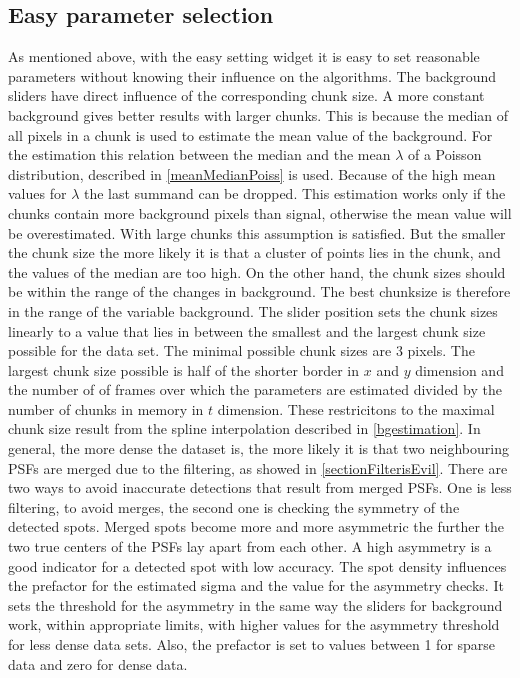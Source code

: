 \subsection{Easy parameter selection}\label{easyParam}
As mentioned above, with the easy setting widget it is easy to set reasonable parameters without knowing their influence on the algorithms.\newline
The background sliders have direct influence of the corresponding chunk size. A more constant background gives better results with larger chunks. This is because the median of all pixels in a chunk is used to estimate the mean value of the background. For the estimation this relation between the median and the mean $\lambda$ of a Poisson distribution, described in \ref{meanMedianPoiss} is used.
Because of the high mean values for $\lambda$ the last summand can be dropped.
This estimation works only if the chunks contain more background pixels than signal, otherwise the mean value will be overestimated. With large chunks this assumption is satisfied. But the smaller the chunk size the more likely it is that a cluster of points lies in the chunk, and the values of the median are too high. On the other hand, the chunk sizes should be within the range of the changes in background. The best chunksize is therefore in the range of the variable background. The slider position sets the chunk sizes linearly to a value that lies in between the smallest and the largest chunk size possible for the data set.\newline
The minimal possible chunk sizes are 3 pixels. The largest chunk size possible is half of the shorter border in $x$ and $y$ dimension and the number of of frames over which the parameters are estimated divided by the number of chunks in memory in $t$ dimension. These restricitons to the maximal chunk size result from the spline interpolation described in \ref{bgestimation}.\newline 
In general, the more dense the dataset is, the more likely it is that two neighbouring PSFs are merged due to the filtering, as showed in \ref{sectionFilterisEvil}. There are two ways to avoid inaccurate detections that result from merged PSFs. One is less filtering, to avoid merges, the second one is checking the symmetry of the detected spots. Merged spots become more and more asymmetric the further the two true centers of the PSFs lay apart from each other. A high asymmetry is a good indicator for a detected spot with low accuracy.
The spot density influences the prefactor for the estimated sigma and the value for the asymmetry checks. It sets the threshold for the asymmetry in the same way the sliders for background work, within appropriate limits, with higher values for the asymmetry threshold for less dense data sets. Also, the prefactor is set to values between 1 for sparse data and zero for dense data.